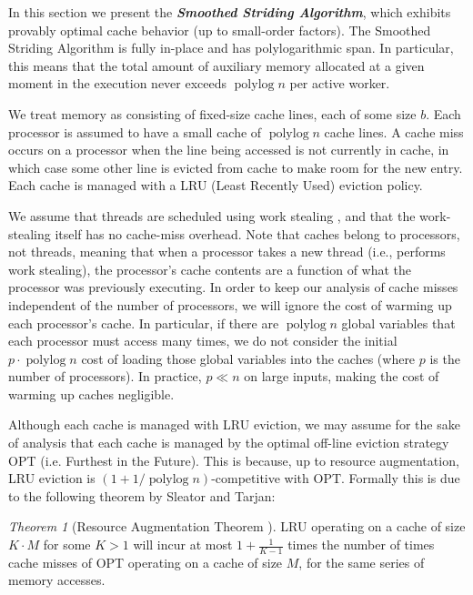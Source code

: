 \documentclass[sigplan, 10pt, nonacm]{acmart}
\newcommand{\polylog}{\operatorname{polylog}}
\newcommand{\defn}[1]{{\textit{\textbf{\boldmath #1}}}}
\renewcommand{\paragraph}[1]{\vspace{0.09in}\noindent{\bf \boldmath #1.}}
\theoremstyle{remark}
\newtheorem{theorem}{Theorem}[section]
\theoremstyle{remark}
\begin{document}

In this section we present the \defn{Smoothed Striding Algorithm},
which exhibits provably optimal cache behavior (up to small-order
factors). The Smoothed Striding Algorithm is fully in-place and has
polylogarithmic span. In particular, this means that the total amount
of auxiliary memory allocated at a given moment in the execution never
exceeds $\polylog n$ per active worker.



\paragraph{Modeling Cache Misses}
We treat memory as consisting of fixed-size cache lines, each of some
size $b$. Each processor is assumed to have a small cache of
$\operatorname{polylog}{n}$ cache lines.  A cache miss occurs on a
processor when the line being accessed is not currently in cache, in
which case some other line is evicted from cache to make room for the
new entry.  Each cache is managed with a LRU (Least Recently Used)
eviction policy.

We assume that threads are scheduled using work stealing \cite{AcarBl00},
and that the work-stealing itself has no cache-miss overhead. Note
that caches belong to processors, not threads, meaning that when a
processor takes a new thread (i.e., performs work stealing), the
processor's cache contents are a function of what the processor was
previously executing. In order to keep our analysis of cache misses
independent of the number of processors, we will ignore the cost of
warming up each processor's cache. In particular, if there are
$\polylog n$ global variables that each processor must access many
times, we do not consider the initial $p \cdot \polylog n$ cost of
loading those global variables into the caches (where $p$ is the
number of processors). In practice, $p \ll n$ on large inputs, making
the cost of warming up caches negligible.

Although each cache is managed with LRU eviction, we may assume
for the sake of analysis that each cache is managed by the optimal
off-line eviction strategy OPT (i.e. Furthest in the Future). This is
because, up to resource augmentation, LRU eviction is $(1 + 1/\polylog
n)$-competitive with OPT. Formally this is due to the following
theorem by Sleator and Tarjan:
\begin{theorem}[Resource Augmentation Theorem \cite{SleatorTa85}]
  LRU operating on a cache of size $K\cdot M$ for some $K>1$ will incur at most
  $1+\frac{1}{K-1}$ times the number of times cache misses of OPT operating on
  a cache of size $M$, for the same series of memory accesses.
  \label{thm:augmentation}
\end{theorem}
\end{document}
